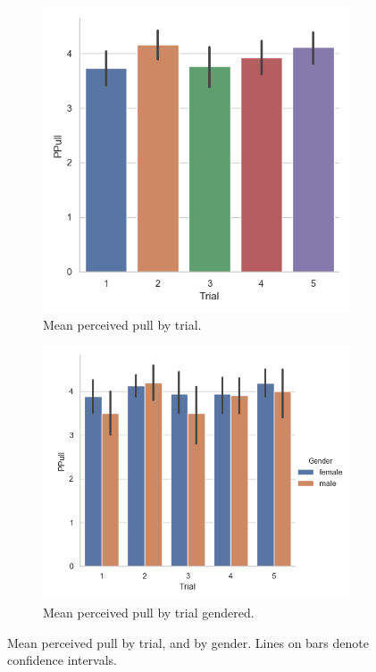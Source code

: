  \begin{figure}[H]
 \begin{subfigure}[b]{0.5\textwidth}
     \centering
     \includegraphics[scale=0.5]{Files/Plots/ppull_by_trial_mean.png}
     \caption{Mean perceived pull by trial.}
     \label{fig:meanPpullTrial}
 \end{subfigure}
  \begin{subfigure}[b]{0.5\textwidth}
     \centering
     \includegraphics[scale=0.5]{Files/Plots/ppull_by_trial_mean_gen.png}
     \caption{Mean perceived pull by trial gendered.}
     \label{fig:meanPPullGenTrial}
 \end{subfigure}
     \caption{Mean perceived pull by trial, and by gender. Lines on bars denote confidence intervals.}
    \label{fig:ppullByTrial}
\end{figure}

